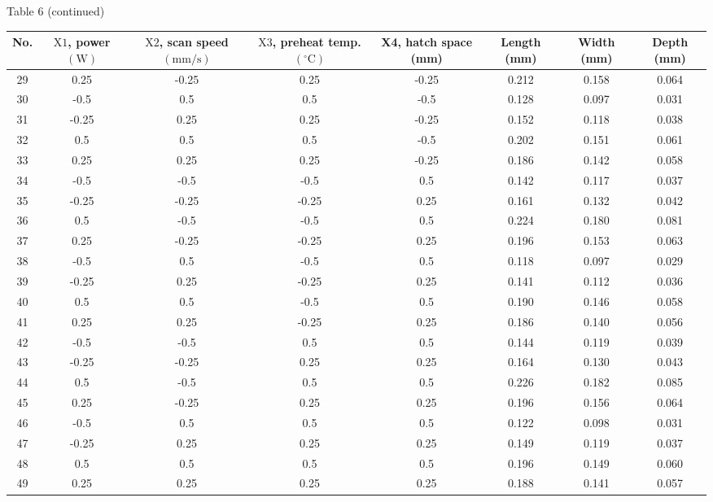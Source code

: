 \documentclass[10pt]{article}
\begin{document}
Table 6 (continued)

\begin{center}
\begin{tabular}{|c|c|c|c|c|c|c|c|}
\hline
No. & $\mathrm{X} 1$, power $(\mathrm{W})$ & $\mathrm{X} 2$, scan speed $(\mathrm{mm} / \mathrm{s})$ & $\mathrm{X} 3$, preheat temp. $\left({ }^{\circ} \mathrm{C}\right)$ & X4, hatch space (mm) & Length (mm) & Width (mm) & Depth (mm) \\
\hline
29 & 0.25 & -0.25 & 0.25 & -0.25 & 0.212 & 0.158 & 0.064 \\
\hline
30 & -0.5 & 0.5 & 0.5 & -0.5 & 0.128 & 0.097 & 0.031 \\
\hline
31 & -0.25 & 0.25 & 0.25 & -0.25 & 0.152 & 0.118 & 0.038 \\
\hline
32 & 0.5 & 0.5 & 0.5 & -0.5 & 0.202 & 0.151 & 0.061 \\
\hline
33 & 0.25 & 0.25 & 0.25 & -0.25 & 0.186 & 0.142 & 0.058 \\
\hline
34 & -0.5 & -0.5 & -0.5 & 0.5 & 0.142 & 0.117 & 0.037 \\
\hline
35 & -0.25 & -0.25 & -0.25 & 0.25 & 0.161 & 0.132 & 0.042 \\
\hline
36 & 0.5 & -0.5 & -0.5 & 0.5 & 0.224 & 0.180 & 0.081 \\
\hline
37 & 0.25 & -0.25 & -0.25 & 0.25 & 0.196 & 0.153 & 0.063 \\
\hline
38 & -0.5 & 0.5 & -0.5 & 0.5 & 0.118 & 0.097 & 0.029 \\
\hline
39 & -0.25 & 0.25 & -0.25 & 0.25 & 0.141 & 0.112 & 0.036 \\
\hline
40 & 0.5 & 0.5 & -0.5 & 0.5 & 0.190 & 0.146 & 0.058 \\
\hline
41 & 0.25 & 0.25 & -0.25 & 0.25 & 0.186 & 0.140 & 0.056 \\
\hline
42 & -0.5 & -0.5 & 0.5 & 0.5 & 0.144 & 0.119 & 0.039 \\
\hline
43 & -0.25 & -0.25 & 0.25 & 0.25 & 0.164 & 0.130 & 0.043 \\
\hline
44 & 0.5 & -0.5 & 0.5 & 0.5 & 0.226 & 0.182 & 0.085 \\
\hline
45 & 0.25 & -0.25 & 0.25 & 0.25 & 0.196 & 0.156 & 0.064 \\
\hline
46 & -0.5 & 0.5 & 0.5 & 0.5 & 0.122 & 0.098 & 0.031 \\
\hline
47 & -0.25 & 0.25 & 0.25 & 0.25 & 0.149 & 0.119 & 0.037 \\
\hline
48 & 0.5 & 0.5 & 0.5 & 0.5 & 0.196 & 0.149 & 0.060 \\
\hline
49 & 0.25 & 0.25 & 0.25 & 0.25 & 0.188 & 0.141 & 0.057 \\
\hline
\end{tabular}
\end{center}
\end{document}
